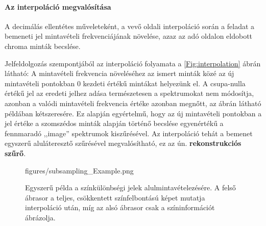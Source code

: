 \paragraph{Az interpoláció megvalósítása}
A decimálás ellentétes műveleteként, a vevő oldali interpoláció során a feladat a bemeneti jel mintavételi frekvenciájának növelése, azaz az adó oldalon eldobott chroma minták becslése.

Jelfeldolgozás szempontjából az interpoláció folyamata a \ref{Fig:interpolation} ábrán látható:
A mintavételi frekvencia növeléséhez az ismert minták közé az új mintavételi pontokban 0 kezdeti értékű mintákat helyezünk el.
A csupa-nulla értékű jel az eredeti jelhez adása természetesen a spektrumokat nem módosítja, azonban a valódi mintavételi frekvencia értéke azonban megnőtt, az ábrán látható példában kétszeresére.
Ez alapján egyértelmű, hogy az új mintavételi pontokban a jel értéke a szomszédos minták alapján történő becslése egyenértékű a fennmaradó ,,image'' spektrumok kiszűrésével.
Az interpoláció tehát a bemenet egyszerű aluláteresztő szűrésével megvalósítható, ez az ún. \textbf{rekonstrukciós szűrő}.
\begin{figure}[t!]
	\centering
	\begin{overpic}[width = 0.8\columnwidth]{figures/subsampling_Example.png}
 	\end{overpic}
	\caption{Egyszerű példa a színkülönbségi jelek alulmintavételezésére.
	A felső ábrasor a teljes, csökkentett színfelbontású képet mutatja interpoláció után, míg az alsó ábrasor csak a színinformációt ábrázolja.}
	\label{Fig:chroma_subsampling_Ex}
\end{figure}

